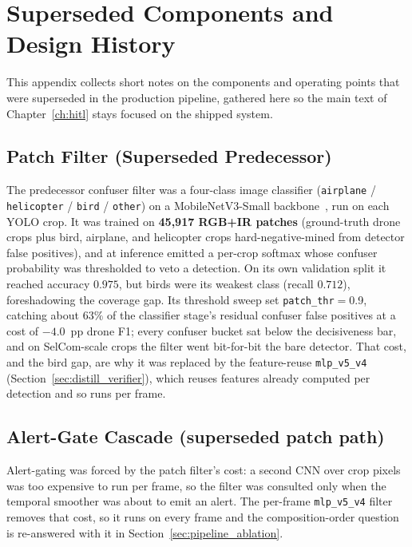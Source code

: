 \chapter{Superseded Components and Design History}
\label{app:design_history}

This appendix collects short notes on the components and operating points that were superseded in the production pipeline, gathered here so the main text of Chapter~\ref{ch:hitl} stays focused on the shipped system.


\section{Patch Filter (Superseded Predecessor)}
\label{sec:patch_verifier_arch}

The predecessor confuser filter was a four-class image classifier (\texttt{airplane} / \texttt{helicopter} / \texttt{bird} / \texttt{other}) on a MobileNetV3-Small backbone~\cite{howard2019mobilenetv3}, run on each YOLO crop. It was trained on \textbf{45{,}917 RGB+IR patches} (ground-truth drone crops plus bird, airplane, and helicopter crops hard-negative-mined from detector false positives), and at inference emitted a per-crop softmax whose confuser probability was thresholded to veto a detection. On its own validation split it reached accuracy $0.975$, but birds were its weakest class (recall $0.712$), foreshadowing the coverage gap. Its threshold sweep set \texttt{patch\_thr}$=$0.9, catching about $63\%$ of the classifier stage's residual confuser false positives at a cost of $-4.0$~pp drone F1; every confuser bucket sat below the decisiveness bar, and on SelCom-scale crops the filter went bit-for-bit the bare detector. That cost, and the bird gap, are why it was replaced by the feature-reuse \texttt{mlp\_v5\_v4} (Section~\ref{sec:distill_verifier}), which reuses features already computed per detection and so runs per frame.

\section{Alert-Gate Cascade (superseded patch path)}
\label{sec:alert_gate}

Alert-gating was forced by the patch filter's cost: a second CNN over crop pixels was too expensive to run per frame, so the filter was consulted only when the temporal smoother was about to emit an alert. The per-frame \texttt{mlp\_v5\_v4} filter removes that cost, so it runs on every frame and the composition-order question is re-answered with it in Section~\ref{sec:pipeline_ablation}.


